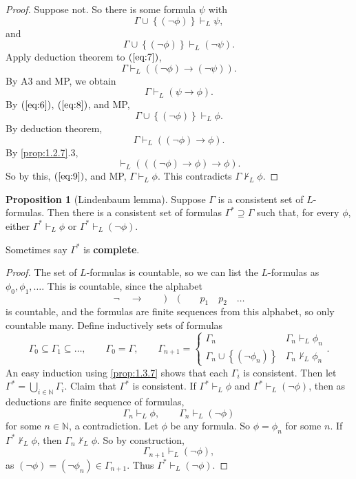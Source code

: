 \documentclass{article}
\newcommand{\N}{\mathbb{N}}
\newcommand{\rb}[1]{\left( #1 \right)}
\newcommand{\cb}[1]{\left\{ #1 \right\}}
\newcommand{\notb}[1]{\rb{\neg #1}}
\newcommand{\impb}[2]{\rb{#1 \rightarrow #2}}
\theoremstyle{definition}\newtheorem{definition}{Definition}[subsection]
\theoremstyle{definition}\newtheorem{remark1}[definition]{Remark}
\theoremstyle{definition}\newtheorem{example1}[definition]{Example}
\theoremstyle{definition}\newtheorem*{remark2}{Remark}
\theoremstyle{definition}\newtheorem*{example2}{Example}
\theoremstyle{definition}\newtheorem*{note}{Note}
\theoremstyle{definition}\newtheorem*{notation}{Notation}
\newtheorem{proposition}[definition]{Proposition}
\begin{document}
\begin{proof}
Suppose not. So there is some formula $ \psi $ with
\begin{equation}
\label{eq:6}
\Gamma \cup \cb{\notb{\phi}} \vdash_L \psi,
\end{equation}
and
\begin{equation}
\label{eq:7}
\Gamma \cup \cb{\notb{\phi}} \vdash_L \notb{\psi}.
\end{equation}
Apply deduction theorem to $ \rb{\ref{eq:7}} $,
$$ \Gamma \vdash_L \impb{\notb{\phi}}{\notb{\psi}}. $$
By A3 and MP, we obtain
\begin{equation}
\label{eq:8}
\Gamma \vdash_L \impb{\psi}{\phi}.
\end{equation}
By $ \rb{\ref{eq:6}} $, $ \rb{\ref{eq:8}} $, and MP,
$$ \Gamma \cup \cb{\notb{\phi}} \vdash_L \phi. $$
By deduction theorem,
\begin{equation}
\label{eq:9}
\Gamma \vdash_L \impb{\notb{\phi}}{\phi}.
\end{equation}
By \ref{prop:1.2.7}.$ 3 $,
$$ \vdash_L \impb{\impb{\notb{\phi}}{\phi}}{\phi}. $$
So by this, $ \rb{\ref{eq:9}} $, and MP, $ \Gamma \vdash_L \phi $. This contradicts $ \Gamma \not\vdash_L \phi $.
\end{proof}

\begin{proposition}[Lindenbaum lemma]
\label{prop:1.3.8}
Suppose $ \Gamma $ is a consistent set of $ L $-formulas. Then there is a consistent set of formulas $ \Gamma^* \supseteq \Gamma $ such that, for every $ \phi $, either $ \Gamma^* \vdash_L \phi $ or $ \Gamma^* \vdash_L \notb{\phi} $.
\end{proposition}

Sometimes say $ \Gamma^* $ is \textbf{complete}.

\begin{proof}
The set of $ L $-formulas is countable, so we can list the $ L $-formulas as $ \phi_0, \phi_1, \dots $. This is countable, since the alphabet
$$ \neg \quad \rightarrow \qquad ) \quad ( \qquad p_1 \quad p_2 \quad \dots $$
is countable, and the formulas are finite sequences from this alphabet, so only countable many. Define inductively sets of formulas
$$ \Gamma_0 \subseteq \Gamma_1 \subseteq \dots, \qquad \Gamma_0 = \Gamma, \qquad \Gamma_{n + 1} = \begin{cases}
\Gamma_n & \Gamma_n \vdash_L \phi_n \\
\Gamma_n \cup \cb{\notb{\phi_n}} & \Gamma_n \not\vdash_L \phi_n
\end{cases}. $$
An easy induction using \ref{prop:1.3.7} shows that each $ \Gamma_i $ is consistent. Then let $ \Gamma^* = \bigcup_{i \in \N} \Gamma_i $. Claim that $ \Gamma^* $ is consistent. If $ \Gamma^* \vdash_L \phi $ and $ \Gamma^* \vdash_L \notb{\phi} $, then as deductions are finite sequence of formulas,
$$ \Gamma_n \vdash_L \phi, \qquad \Gamma_n \vdash_L \notb{\phi} $$
for some $ n \in \N $, a contradiction. Let $ \phi $ be any formula. So $ \phi = \phi_n $ for some $ n $. If $ \Gamma^* \not\vdash_L \phi $, then $ \Gamma_n \not\vdash_L \phi $. So by construction,
$$ \Gamma_{n + 1} \vdash_L \notb{\phi}, $$
as $ \notb{\phi} = \notb{\phi_n} \in \Gamma_{n + 1} $. Thus $ \Gamma^* \vdash_L \notb{\phi} $.
\end{proof}
\end{document}
